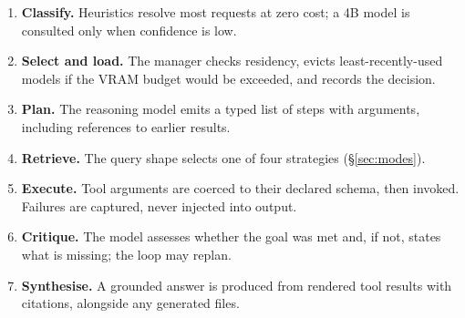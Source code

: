 \begin{enumerate}
\item \textbf{Classify.} Heuristics resolve most requests at zero cost;
      a 4B model is consulted only when confidence is low.
\item \textbf{Select and load.} The manager checks residency, evicts
      least-recently-used models if the VRAM budget would be exceeded, and
      records the decision.
\item \textbf{Plan.} The reasoning model emits a typed list of steps with
      arguments, including  references to earlier results.
\item \textbf{Retrieve.} The query shape selects one of four strategies
      (\S\ref{sec:modes}).
\item \textbf{Execute.} Tool arguments are coerced to their declared schema,
      then invoked. Failures are captured, never injected into output.
\item \textbf{Critique.} The model assesses whether the goal was met and, if
      not, states what is missing; the loop may replan.
\item \textbf{Synthesise.} A grounded answer is produced from rendered tool
      results with citations, alongside any generated files.
\end{enumerate}
